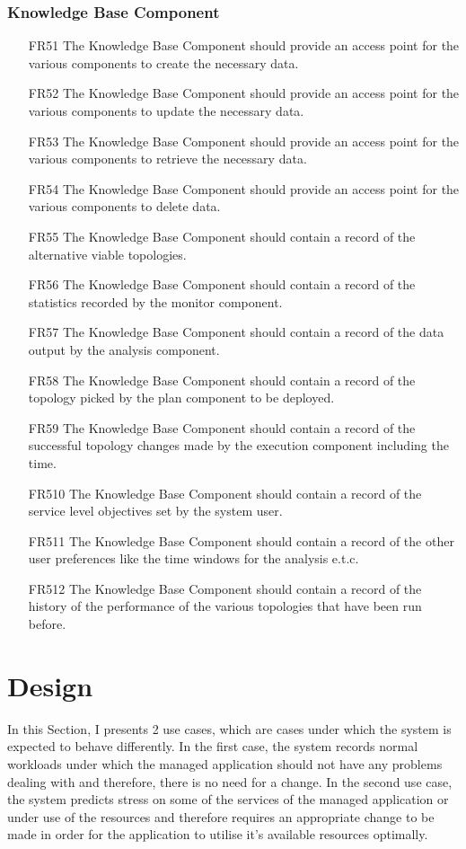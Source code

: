 \subsubsection{\textbf{Knowledge Base Component}}
\begin{itemize}
    \item [FR51] The Knowledge Base Component should provide an access point for the various components to create the necessary data.
    \item [FR52] The Knowledge Base Component should provide an access point for the various components to update the necessary data.
    \item [FR53] The Knowledge Base Component should provide an access point for the various components to retrieve the necessary data.
    \item [FR54] The Knowledge Base Component should provide an access point for the various components to delete data.
    \item [FR55] The Knowledge Base Component should contain a record of the alternative viable topologies.
    \item [FR56] The Knowledge Base Component should contain a record of the statistics recorded by the monitor component.
    \item [FR57] The Knowledge Base Component should contain a record of the data output by the analysis component.
    \item [FR58] The Knowledge Base Component should contain a record of the topology picked by the plan component to be deployed.
    \item [FR59] The Knowledge Base Component should contain a record of the successful topology changes made by the execution component including the time.
    \item [FR510] The Knowledge Base Component should contain a record of the service level objectives set by the system user.
    \item [FR511] The Knowledge Base Component should contain a record of the other user preferences like the time windows for the analysis e.t.c.
    \item [FR512] The Knowledge Base Component should contain a record of the history of the performance of the various topologies that have been run before.
\end{itemize}
\newpage
\section{Design} %
In this Section, I presents 2 use cases, which are cases under which the system is expected to behave differently. In the first case, the system records normal workloads under which the managed application should not have any problems dealing with and therefore, there is no need for a change. In the second use case, the system predicts stress on some of the services of the managed application or under use of the resources and therefore requires an appropriate change to be made in order for the application to utilise it's available resources optimally.
